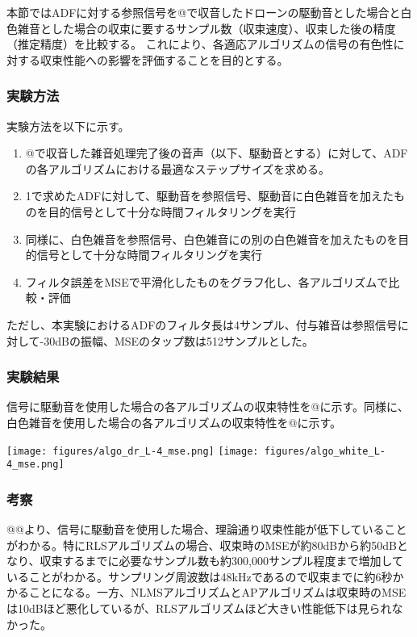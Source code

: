本節ではADFに対する参照信号を@で収音したドローンの駆動音とした場合と白色雑音とした場合の収束に要するサンプル数（収束速度）、収束した後の精度（推定精度）を比較する。
これにより、各適応アルゴリズムの信号の有色性に対する収束性能への影響を評価することを目的とする。

\hypertarget{ux5b9fux9a13ux65b9ux6cd5-1}{%
\subsubsection{実験方法}\label{ux5b9fux9a13ux65b9ux6cd5-1}}

実験方法を以下に示す。

\begin{enumerate}
\def\labelenumi{\arabic{enumi}.}
\tightlist
\item
  @で収音した雑音処理完了後の音声（以下、駆動音とする）に対して、ADFの各アルゴリズムにおける最適なステップサイズを求める。
\item
  1で求めたADFに対して、駆動音を参照信号、駆動音に白色雑音を加えたものを目的信号として十分な時間フィルタリングを実行
\item
  同様に、白色雑音を参照信号、白色雑音にの別の白色雑音を加えたものを目的信号として十分な時間フィルタリングを実行
\item
  フィルタ誤差をMSEで平滑化したものをグラフ化し、各アルゴリズムで比較・評価
\end{enumerate}

ただし、本実験におけるADFのフィルタ長は4サンプル、付与雑音は参照信号に対して-30dBの振幅、MSEのタップ数は512サンプルとした。

\hypertarget{ux5b9fux9a13ux7d50ux679c-1}{%
\subsubsection{実験結果}\label{ux5b9fux9a13ux7d50ux679c-1}}

信号に駆動音を使用した場合の各アルゴリズムの収束特性を@に示す。同様に、白色雑音を使用した場合の各アルゴリズムの収束特性を@に示す。

\texttt{[image: figures/algo\_dr\_L-4\_mse.png]}
\texttt{[image: figures/algo\_white\_L-4\_mse.png]}

\hypertarget{ux8003ux5bdf-1}{%
\subsubsection{考察}\label{ux8003ux5bdf-1}}

@@より、信号に駆動音を使用した場合、理論通り収束性能が低下していることがわかる。特にRLSアルゴリズムの場合、収束時のMSEが約80dBから約50dBとなり、収束するまでに必要なサンプル数も約300,000サンプル程度まで増加していることがわかる。サンプリング周波数は48kHzであるので収束までに約6秒かかることになる。一方、NLMSアルゴリズムとAPアルゴリズムは収束時のMSEは10dBほど悪化しているが、RLSアルゴリズムほど大きい性能低下は見られなかった。


